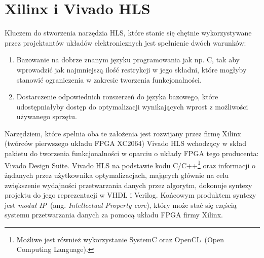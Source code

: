 \section{Xilinx i Vivado HLS}
Kluczem do stworzenia narzędzia HLS, które stanie się chętnie wykorzystywane przez projektantów układów elektronicznych jest spełnienie dwóch warunków:
\begin{enumerate}
\item Bazowanie na dobrze znanym języku programowania jak np. C, tak aby wprowadzić jak najmniejszą ilość restrykcji w jego składni, które mogłyby stanowić ograniczenia w zakresie tworzenia funkcjonalności.
\item Dostarczenie odpowiednich rozszerzeń do języka bazowego, które udostępniałyby dostęp do optymalizacji wynikających wprost z możliwości używanego sprzętu.
\end{enumerate}
Narzędziem, które spełnia oba te założenia jest rozwijany przez firmę Xilinx (twórców pierwszego układu FPGA XC2064) Vivado HLS wchodzący w skład pakietu do tworzenia funkcjonalności w oparciu o układy FPGA tego producenta: Vivado Design Suite. Vivado HLS na podstawie kodu C/C++\footnote{Możliwe jest również wykorzystanie SystemC oraz OpenCL~(Open Computing Language).} oraz informacji o żądanych przez użytkownika optymalizacjach, mających głównie na celu zwiększenie wydajności przetwarzania danych przez algorytm, dokonuje syntezy projektu do jego reprezentacji w VHDL i Verilog. Końcowym produktem syntezy jest \textit{moduł IP}~(ang. \textit{Intellectual Property core}), który może stać się częścią systemu przetwarzania danych za pomocą układu FPGA firmy Xilinx.

